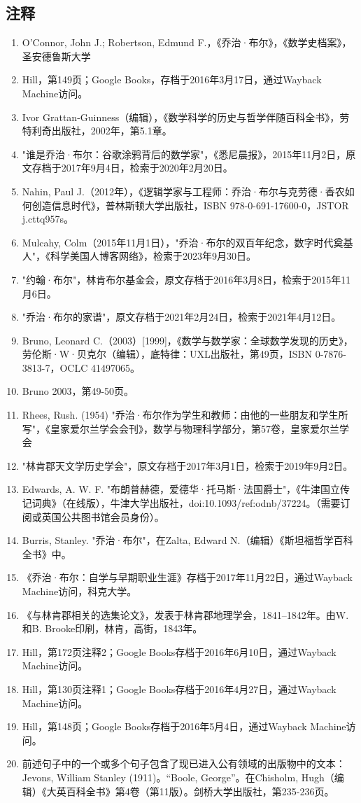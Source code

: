 \subsection{注释}  
\begin{enumerate}
\item O'Connor, John J.; Robertson, Edmund F.，《乔治·布尔》，《数学史档案》，圣安德鲁斯大学  
\item Hill，第149页；Google Books，存档于2016年3月17日，通过Wayback Machine访问。  
\item Ivor Grattan-Guinness（编辑），《数学科学的历史与哲学伴随百科全书》，劳特利奇出版社，2002年，第5.1章。  
\item "谁是乔治·布尔：谷歌涂鸦背后的数学家"，《悉尼晨报》，2015年11月2日，原文存档于2017年9月4日，检索于2020年2月20日。  
\item Nahin, Paul J.（2012年），《逻辑学家与工程师：乔治·布尔与克劳德·香农如何创造信息时代》，普林斯顿大学出版社，ISBN 978-0-691-17600-0，JSTOR j.cttq957s。  
\item Mulcahy, Colm（2015年11月1日），"乔治·布尔的双百年纪念，数字时代奠基人"，《科学美国人博客网络》，检索于2023年9月30日。  
\item "约翰·布尔"，林肯布尔基金会，原文存档于2016年3月8日，检索于2015年11月6日。  
\item "乔治·布尔的家谱"，原文存档于2021年2月24日，检索于2021年4月12日。  
\item Bruno, Leonard C.（2003）[1999]，《数学与数学家：全球数学发现的历史》，劳伦斯·W·贝克尔（编辑），底特律：UXL出版社，第49页，ISBN 0-7876-3813-7，OCLC 41497065。  
\item Bruno 2003，第49-50页。
\item Rhees, Rush. (1954) "乔治·布尔作为学生和教师：由他的一些朋友和学生所写"，《皇家爱尔兰学会会刊》，数学与物理科学部分，第57卷，皇家爱尔兰学会  
\item "林肯郡天文学历史学会"，原文存档于2017年3月1日，检索于2019年9月2日。  
\item Edwards, A. W. F. "布朗普赫德，爱德华·托马斯·法国爵士"，《牛津国立传记词典》（在线版），牛津大学出版社，doi:10.1093/ref:odnb/37224。（需要订阅或英国公共图书馆会员身份）。  
\item Burris, Stanley. "乔治·布尔"，在Zalta, Edward N.（编辑）《斯坦福哲学百科全书》中。  
\item 《乔治·布尔：自学与早期职业生涯》存档于2017年11月22日，通过Wayback Machine访问，科克大学。  
\item 《与林肯郡相关的选集论文》，发表于林肯郡地理学会，1841–1842年。由W.和B. Brooke印刷，林肯，高街，1843年。  
\item Hill，第172页注释2；Google Books存档于2016年6月10日，通过Wayback Machine访问。  
\item Hill，第130页注释1；Google Books存档于2016年4月27日，通过Wayback Machine访问。  
\item Hill，第148页；Google Books存档于2016年5月4日，通过Wayback Machine访问。  
\item 前述句子中的一个或多个句子包含了现已进入公有领域的出版物中的文本：Jevons, William Stanley (1911)。“Boole, George”。在Chisholm, Hugh（编辑）《大英百科全书》第4卷（第11版）。剑桥大学出版社，第235-236页。
\end{enumerate}